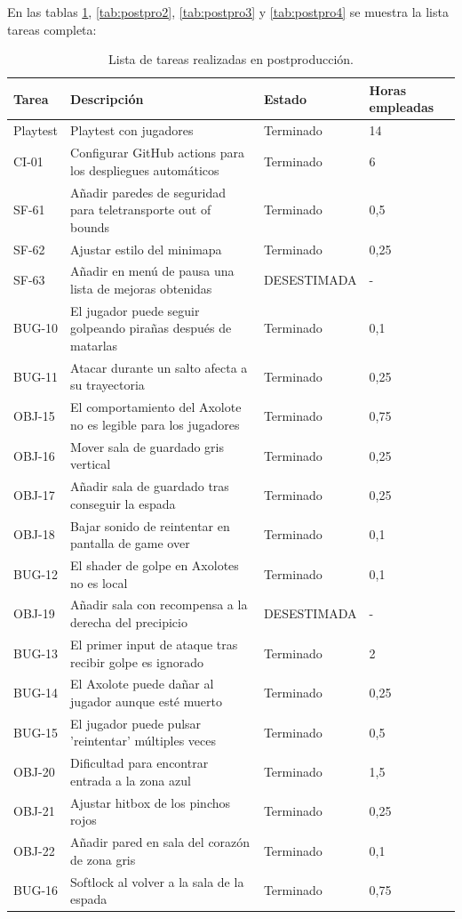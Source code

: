 En las tablas \ref{tab:postpro1}, \ref{tab:postpro2}, \ref{tab:postpro3} y \ref{tab:postpro4} se muestra la lista tareas completa:

\begin{table}[hbt]
    \centering
    \begin{tabular}{|l|p{6cm}|l|p{2cm}|}
    \hline
    \textbf{Tarea} & \textbf{Descripción} & \textbf{Estado} & \textbf{Horas empleadas} \\ \hline
    Playtest & Playtest con jugadores & Terminado & 14 \\ \hline
    CI-01 & Configurar GitHub actions para los despliegues automáticos & Terminado & 6 \\ \hline
    SF-61 & Añadir paredes de seguridad para teletransporte out of bounds & Terminado & 0,5 \\ \hline
    SF-62 & Ajustar estilo del minimapa & Terminado & 0,25 \\ \hline
    SF-63 & Añadir en menú de pausa una lista de mejoras obtenidas & DESESTIMADA & - \\ \hline
    BUG-10 & El jugador puede seguir golpeando pirañas después de matarlas & Terminado & 0,1 \\ \hline
    BUG-11 & Atacar durante un salto afecta a su trayectoria & Terminado & 0,25 \\ \hline
    OBJ-15 & El comportamiento del Axolote no es legible para los jugadores & Terminado & 0,75 \\ \hline
    OBJ-16 & Mover sala de guardado gris vertical & Terminado & 0,25 \\ \hline
    OBJ-17 & Añadir sala de guardado tras conseguir la espada & Terminado & 0,25 \\ \hline
    OBJ-18 & Bajar sonido de reintentar en pantalla de game over & Terminado & 0,1 \\ \hline
    BUG-12 & El shader de golpe en Axolotes no es local & Terminado & 0,1 \\ \hline
    OBJ-19 & Añadir sala con recompensa a la derecha del precipicio & DESESTIMADA & - \\ \hline
    BUG-13 & El primer input de ataque tras recibir golpe es ignorado & Terminado & 2 \\ \hline
    BUG-14 & El Axolote puede dañar al jugador aunque esté muerto & Terminado & 0,25 \\ \hline
    BUG-15 & El jugador puede pulsar 'reintentar' múltiples veces & Terminado & 0,5 \\ \hline
    OBJ-20 & Dificultad para encontrar entrada a la zona azul & Terminado & 1,5 \\ \hline
    OBJ-21 & Ajustar hitbox de los pinchos rojos & Terminado & 0,25 \\ \hline
    OBJ-22 & Añadir pared en sala del corazón de zona gris & Terminado & 0,1 \\ \hline
    BUG-16 & Softlock al volver a la sala de la espada & Terminado & 0,75 \\ \hline
    \end{tabular}
    \caption{Lista de tareas realizadas en postproducción.}
    \label{tab:postpro1}
\end{table}


